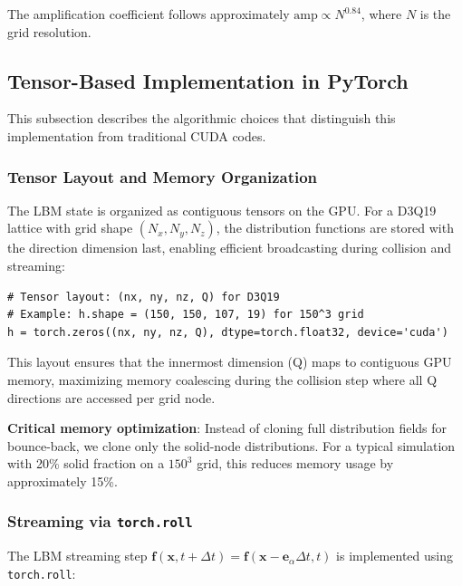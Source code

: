 The amplification coefficient follows approximately $\text{amp} \propto N^{0.84}$, where $N$ is the grid resolution.

\subsection{Tensor-Based Implementation in PyTorch}

This subsection describes the algorithmic choices that distinguish this implementation from traditional CUDA codes.

\subsubsection{Tensor Layout and Memory Organization}

The LBM state is organized as contiguous tensors on the GPU. For a D3Q19 lattice with grid shape $(N_x, N_y, N_z)$, the distribution functions are stored with the direction dimension last, enabling efficient broadcasting during collision and streaming:

\begin{verbatim}
# Tensor layout: (nx, ny, nz, Q) for D3Q19
# Example: h.shape = (150, 150, 107, 19) for 150^3 grid
h = torch.zeros((nx, ny, nz, Q), dtype=torch.float32, device='cuda')
\end{verbatim}

This layout ensures that the innermost dimension (Q) maps to contiguous GPU memory, maximizing memory coalescing during the collision step where all Q directions are accessed per grid node.

\textbf{Critical memory optimization}: Instead of cloning full distribution fields for bounce-back, we clone only the solid-node distributions. For a typical simulation with 20\% solid fraction on a $150^3$ grid, this reduces memory usage by approximately 15\%.

\subsubsection{Streaming via \texttt{torch.roll}}

The LBM streaming step $\mathbf{f}(\mathbf{x}, t+\Delta t) = \mathbf{f}(\mathbf{x} - \mathbf{e}_\alpha \Delta t, t)$ is implemented using \texttt{torch.roll}:


